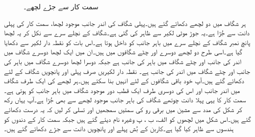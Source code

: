 \begin{figure}
\caption{سمت کار سے جڑے لچھے۔}
\label{شکل_یکسمتی_سمتکار_سے_جڑے_لچھے}
\end{figure}

ہر شگاف میں دو لچھے دکھائے گئے ہیں۔پہلی شگاف کی اندر جانب موجود لچھا، سمت کار کی پہلی دانت سے جُڑا ہے۔یہ جوڑ موٹی لکیر سے ظاہر کی گئی ہے۔شگاف کے نچلے سرے سے نکل کر یہ لچھا پانچ نمبر شگاف کے نچلے سرے میں باہر جانب کو داخل ہوتا ہے۔اس بات کو نقطہ دار لکیر سے دکھایا گیا ہے۔اسی طرح دو لچھے دوسرے اور چٹے شگافوں میں ہیں۔ان میں ایک لچھا دوسرے شگاف میں اندر کی جانب اور چٹے شگاف میں باہر کی جانب ہے جبکہ دوسرا لچھا دوسرے شگاف میں باہر کی جانب اور چٹے شگاف میں اندر کی جانب ہے۔ نقطہ دار لکیریں صرف پہلی اور پانچویں شگاف کے لئے دکھائے گئے ہیں۔آپ خود باقی شگافوں کے لئے انہیں بنا سکتے ہیں۔ہر لچھے کی ایک طرف شگاف میں اندر جانب  اور اس کی دوسری طرف ایک قطب دور موجود شگاف میں باہر جانب کو ہوتی ہے۔سمت کار کا یہی پہلا دانت چوتھے شگاف کی باہر جانب موجود لچھے سے بھی جُڑا ہے۔آپ یہاں رکھ کر شکل   کی مدد سے مشین میں برقی رو کی سمتیں سمجھیں اور تسلی کر لیں کہ یہ درست دکھائے گئے ہیں۔اس شکل میں لچھوں کو الف، ب ، پ وغیرہ نام دیئے گئے ہیں جبکہ سمت کار کے دندوں کو ہندسوں سے ظاہر کیا گیا ہے۔کاربن کے بُش پہلے اور پانچویں دانت سے جڑے دکھائے گئے ہیں۔

